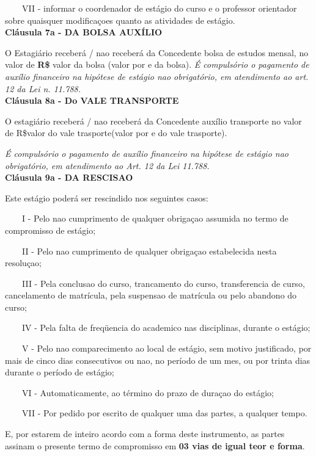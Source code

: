 \documentclass[10pt,a4paper]{article}
\begin{document}
\ \ \ \ VII - informar o coordenador de estágio do curso e o professor 
orientador sobre quaisquer modificaçoes quanto as atividades de estágio.
\\

\textbf{Cláusula 7a - DA BOLSA AUXÍLIO}

O Estagiário receberá / nao receberá da Concedente bolsa de estudos 
mensal, no valor de \textbf{R\$ }valor da bolsa
(valor por e da bolsa).
\textit{É compulsório o pagamento de auxílio financeiro na hipótese de 
estágio nao obrigatório, em atendimento ao art. 12 da Lei n. 11.788.}
\\

\textbf{Cláusula 8a - Do VALE TRANSPORTE}

O estagiário receberá / nao receberá da Concedente auxílio transporte no 
valor de R\$valor do vale trasporte(valor por e do vale trasporte).

\textit{É compulsório o pagamento de auxílio financeiro na hipótese de 
estágio nao obrigatório, em atendimento ao Art. 12 da Lei 11.788.}
\\






\textbf{Cláusula 9a - DA RESCISAO}

Este estágio poderá ser rescindido nos seguintes casos:

\ \ \ \ I - Pelo nao cumprimento de qualquer obrigaçao assumida no termo 
de compromisso de estágio;

\ \ \ \ II - Pelo nao cumprimento de qualquer obrigaçao estabelecida 
nesta resoluçao;

\ \ \ \ III - Pela conclusao do curso, trancamento do curso, 
transferencia de curso, cancelamento de matrícula, pela suspensao de 
matrícula ou pelo abandono do curso;

\ \ \ \ IV - Pela falta de freqüencia do academico nas disciplinas, 
durante o estágio;

\ \ \ \ V - Pelo nao comparecimento ao local de estágio, sem motivo 
justificado, por mais de cinco dias consecutivos ou nao, no período de 
um mes, ou por trinta dias durante o período de estágio;

\ \ \ \ VI - Automaticamente, ao término do prazo de duraçao do estágio;

\ \ \ \ VII - Por pedido por escrito de qualquer uma das partes, a 
qualquer tempo. 



E, por estarem de inteiro acordo com a forma deste instrumento, as 
partes assinam o presente termo de compromisso em \textbf{03 vias de 
igual teor e forma}.
\end{document}
